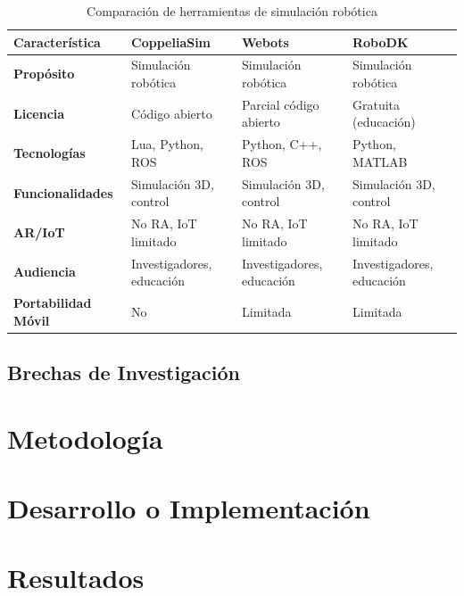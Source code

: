 \documentclass[12pt,letterpaper]{report}
\begin{document}
	\begin{table}[H]
		\centering
		\caption{Comparación de herramientas de simulación robótica}
		\label{tab:comparacion_simulacion_robotica}
		\scriptsize
		\begin{tabular}{|>{\centering\arraybackslash}p{4.0cm}|>{\centering\arraybackslash}p{4.0cm}|>{\centering\arraybackslash}p{4.0cm}|>{\centering\arraybackslash}p{4.0cm}|}
			\hline
			\textbf{Característica} & \textbf{CoppeliaSim} & \textbf{Webots} & \textbf{RoboDK} \\
			\hline
			\textbf{Propósito} & Simulación robótica & Simulación robótica & Simulación robótica \\
			\hline
			\textbf{Licencia} & Código abierto & Parcial código abierto & Gratuita (educación) \\
			\hline
			\textbf{Tecnologías} & Lua, Python, ROS & Python, C++, ROS & Python, MATLAB \\
			\hline
			\textbf{Funcionalidades} & Simulación 3D, control & Simulación 3D, control & Simulación 3D, control \\
			\hline
			\textbf{AR/IoT} & No RA, IoT limitado & No RA, IoT limitado & No RA, IoT limitado \\
			\hline
			\textbf{Audiencia} & Investigadores, educación & Investigadores, educación & Investigadores, educación \\
			\hline
			\textbf{Portabilidad Móvil} & No & Limitada & Limitada \\
			\hline
		\end{tabular}
	\end{table}
	
	\section{Brechas de Investigación}
	
	\chapter{Metodología}
	
	\chapter{Desarrollo o Implementación}
	
	\chapter{Resultados}
	
\end{document}
